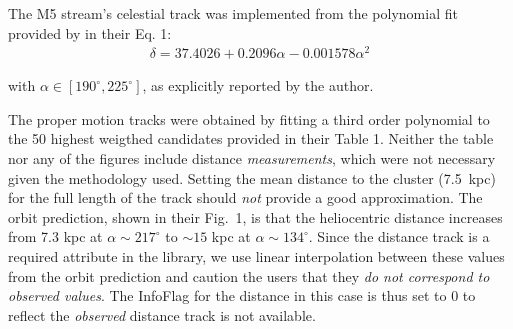 The M5 stream's celestial track was implemented from the polynomial fit provided by \citet{Grillmair2019} in their Eq. 1:
\begin{eqnarray*}
\delta = 37.4026 + 0.2096\alpha -0.001578\alpha^2
\end{eqnarray*}

with $\alpha \in [190^\circ,225^\circ]$, as explicitly reported by the author. 

The proper motion tracks were obtained by fitting a third order polynomial to the 50 highest weigthed candidates provided in their Table 1. Neither the table nor any of the figures include distance \emph{measurements}, which were not necessary given the methodology used. Setting the mean distance to the cluster (7.5~kpc) for the full length of the track should \emph{not} provide a good approximation. The orbit prediction, shown in their Fig.~1, is that the heliocentric distance increases from  7.3 kpc at $\alpha\sim217^\circ$ to $\sim15$ kpc at $\alpha\sim134^\circ$. Since the distance track is a required attribute in the library, we use linear interpolation between these values from the orbit prediction and caution the users that they \emph{do not correspond to observed values}. The InfoFlag for the distance in this case is thus set to 0 to reflect the \emph{observed} distance track is not available.
